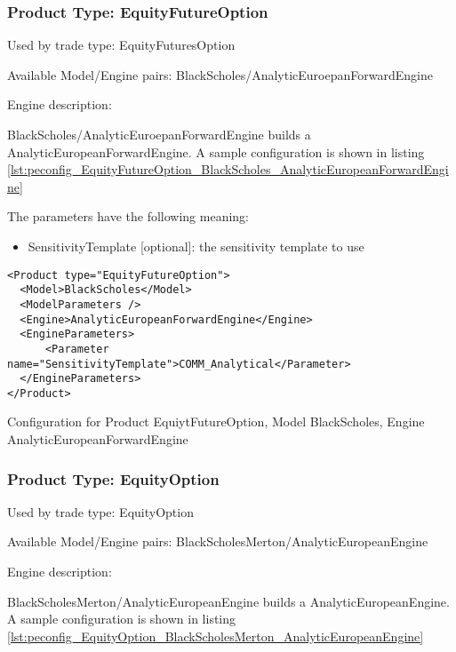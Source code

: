 \subsubsection{Product Type: EquityFutureOption}

Used by trade type: EquityFuturesOption

Available Model/Engine pairs: BlackScholes/AnalyticEuroepanForwardEngine

Engine description:

BlackScholes/AnalyticEuroepanForwardEngine builds a AnalyticEuropeanForwardEngine. A sample configuration is shown in
listing \ref{lst:peconfig_EquityFutureOption_BlackScholes_AnalyticEuropeanForwardEngine}

The parameters have the following meaning:

\begin{itemize}
\item SensitivityTemplate [optional]: the sensitivity template to use 
\end{itemize}

\begin{longlisting}
\begin{verbatim}
<Product type="EquityFutureOption">
  <Model>BlackScholes</Model>
  <ModelParameters />
  <Engine>AnalyticEuropeanForwardEngine</Engine>
  <EngineParameters>
      <Parameter name="SensitivityTemplate">COMM_Analytical</Parameter>
  </EngineParameters>
</Product>
\end{verbatim}
\caption{Configuration for Product EquiytFutureOption, Model BlackScholes, Engine AnalyticEuropeanForwardEngine}
\label{lst:peconfig_EquityFutureOption_BlackScholes_AnalyticEuropeanForwardEngine}
\end{longlisting}

\subsubsection{Product Type: EquityOption}

Used by trade type: EquityOption

Available Model/Engine pairs: BlackScholesMerton/AnalyticEuropeanEngine

Engine description:

BlackScholesMerton/AnalyticEuropeanEngine builds a AnalyticEuropeanEngine. A sample configuration is shown in listing
\ref{lst:peconfig_EquityOption_BlackScholesMerton_AnalyticEuropeanEngine}

